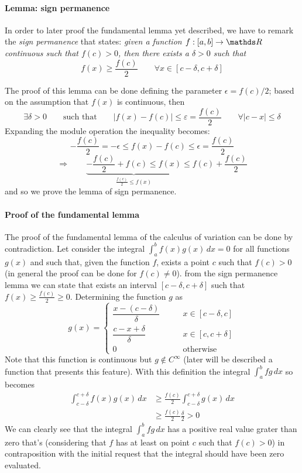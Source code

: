 	\paragraph{Lemma: sign permanence} In order to later proof the fundamental lemma yet described, we have to remark the \textit{sign permanence} that states: {\itshape given a function $f:[a,b]\rightarrow \R$ continuous such that $f(c) >0$, then there exists a $\delta >0$ such that }
	\[ f(x) \geq \frac{f(c)}{2} \qquad \forall x \in [c-\delta,c+\delta] \]
	
	The proof of this lemma can be done defining the parameter $\epsilon = f(c) / 2$; based on the assumption that $f(x)$ is continuous, then
	\[ \exists \delta >0 \qquad \textrm{such that} \qquad |f(x) - f(c)| \leq \varepsilon = \frac{f(c)}{2} \qquad \forall |c-x|\leq \delta \]
	Expanding the module operation the inequality becomes:
	\[ -\frac{f(c)}{2} = - \epsilon \leq f(x)-f(c) \leq \epsilon = \frac{f(c)}{2} \]
	\[ \Rightarrow \qquad \underbrace{-\frac{f(c)}{2} + f(c) \leq f(x)}_{\frac{f(c)}{2} \leq f(x)} \leq f(c) + \frac{f(c)}{2} \]
	and so we prove the lemma of sign permanence.
	
	\paragraph{Proof of the fundamental lemma} The proof of the fundamental lemma of the calculus of variation can be done by contradiction. Let consider the integral $\int_a^b f(x) g(x)\, dx = 0$ for all functions $g(x)$ and such that, given the function $f$, exists a point $c$ such that $f(c) > 0$ (in general the proof can be done for $f(c)\neq 0$). from the sign permanence lemma we can state that exists an interval $[c-\delta,c+\delta]$ such that $f(x) \geq \frac{f(c)}{2 } \geq 0$. Determining the function $g$ as
	\[ g(x) = \begin{cases}
		\dfrac{x-(c-\delta)}{\delta} \qquad & x\in [c-\delta, c] \\
		\dfrac{c-x+\delta}{\delta} & x\in[c,c+\delta] \\
		0 & \textrm{otherwise}
	\end{cases} \]
	Note that this function is continuous but $g\notin C^\infty$ (later will be described a function that presents this feature). With this definition the integral $\int_a^b fg\, dx$ so becomes
	\begin{align*}
		\int_{c-\delta}^{c+\delta} f(x)g(x)\, dx & \geq \frac{f(c)}{2} \int_{c-\delta}^{c+\delta} g(x)\, dx \\
		& \geq \frac{f(c)}{2}\frac \delta 2 > 0
	\end{align*}
	We can clearly see that the integral $\int_a^b fg\, dx$ has a positive real value grater than zero that's (considering that $f$ has at least on point $c$ such that $f(c) >0$) in contraposition with the initial request that the integral should have been zero evaluated. \vspace{3mm}
	
